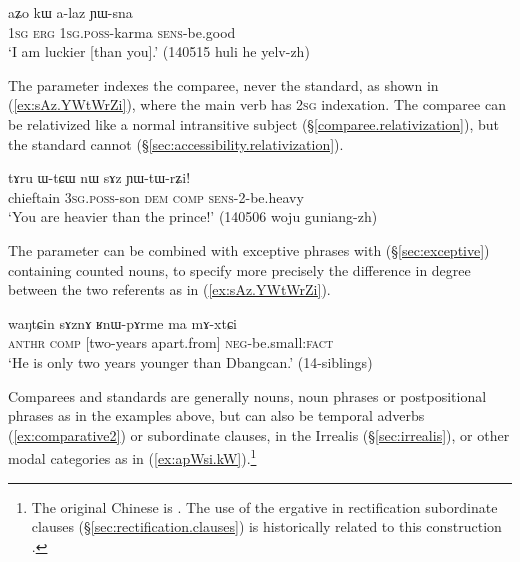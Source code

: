 \begin{exe}
\ex \label{ex:aZo.kW.alaz}
\gll aʑo kɯ a-laz ɲɯ-sna  \\
\textsc{1sg} \textsc{erg} \textsc{1sg}.\textsc{poss}-karma \textsc{sens}-be.good \\
\glt `I am luckier [than you].' (140515 huli he yelv-zh)
\end{exe}


The parameter indexes the comparee, never the standard, as shown in (\ref{ex:sAz.YWtWrZi}), where the main verb has \textsc{2sg} indexation. The comparee can be relativized like a normal intransitive subject (§\ref{comparee.relativization}), but the standard cannot (§\ref{sec:accessibility.relativization}).

\begin{exe}
\ex \label{ex:sAz.YWtWrZi}
\gll tɤru ɯ-tɕɯ nɯ sɤz ɲɯ-tɯ-rʑi! \\
chieftain \textsc{3sg}.\textsc{poss}-son \textsc{dem} \textsc{comp} \textsc{sens}-2-be.heavy \\
\glt `You are heavier than the prince!' (140506 woju guniang-zh)
\end{exe}

The parameter can be combined with exceptive phrases
with  (§\ref{sec:exceptive}) containing counted nouns, to specify more precisely the difference in degree between the two referents as in (\ref{ex:sAz.YWtWrZi}).

\begin{exe}
\ex \label{ex:RWpArme.ma.mAxtCi}
\gll waŋtɕin sɤznɤ ʁnɯ-pɤrme ma mɤ-xtɕi \\
\textsc{anthr} \textsc{comp} [two-years apart.from] \textsc{neg}-be.small:\textsc{fact} \\
\glt `He is only two years younger than Dbangcan.' (14-siblings)
\end{exe}
 
Comparees and standards are generally nouns, noun phrases or postpositional phrases as in the examples above, but can also be temporal adverbs (\ref{ex:comparative2}) or subordinate clauses, in the Irrealis (§\ref{sec:irrealis}), or other modal categories as in (\ref{ex:apWsi.kW}).\footnote{The original Chinese is . The use of the ergative in rectification subordinate clauses (§\ref{sec:rectification.clauses}) is historically related to this construction \citep{jacques16comparative}. }
  
